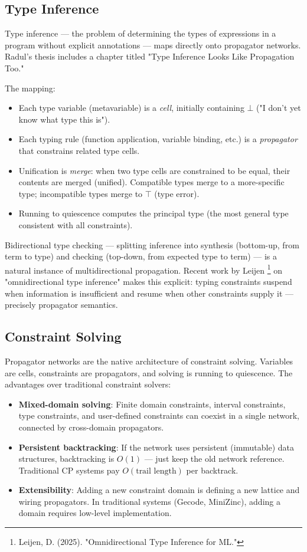 \documentclass[11pt]{article}
\begin{document}
\subsection{Type Inference}
\label{sec:orgc741aaf}

Type inference --- the problem of determining the types of expressions
in a program without explicit annotations --- maps directly onto
propagator networks. Radul's thesis includes a chapter titled "Type
Inference Looks Like Propagation Too."

The mapping:

\begin{itemize}
\item Each type variable (metavariable) is a \emph{cell}, initially containing
\(\bot\) ("I don't yet know what type this is").
\item Each typing rule (function application, variable binding, etc.) is a
\emph{propagator} that constrains related type cells.
\item Unification is \emph{merge}: when two type cells are constrained to be
equal, their contents are merged (unified). Compatible types merge to
a more-specific type; incompatible types merge to \(\top\)
(type error).
\item Running to quiescence computes the principal type (the most general
type consistent with all constraints).
\end{itemize}

Bidirectional type checking --- splitting inference into synthesis
(bottom-up, from term to type) and checking (top-down, from expected
type to term) --- is a natural instance of multidirectional propagation.
Recent work by Leijen \footnote{Leijen, D. (2025). "Omnidirectional Type Inference
for ML."} on "omnidirectional type
inference" makes this explicit: typing constraints suspend when
information is insufficient and resume when other constraints supply it
--- precisely propagator semantics.
\subsection{Constraint Solving}
\label{sec:org41de211}

Propagator networks are the native architecture of constraint solving.
Variables are cells, constraints are propagators, and solving is running
to quiescence. The advantages over traditional constraint solvers:

\begin{itemize}
\item \textbf{Mixed-domain solving}: Finite domain constraints, interval
constraints, type constraints, and user-defined constraints can
coexist in a single network, connected by cross-domain propagators.
\item \textbf{Persistent backtracking}: If the network uses persistent (immutable)
data structures, backtracking is \(O(1)\) --- just keep the old network
reference. Traditional CP systems pay \(O(\text{trail length})\) per
backtrack.
\item \textbf{Extensibility}: Adding a new constraint domain is defining a new
lattice and wiring propagators. In traditional systems (Gecode,
MiniZinc), adding a domain requires low-level implementation.
\end{itemize}
\end{document}
